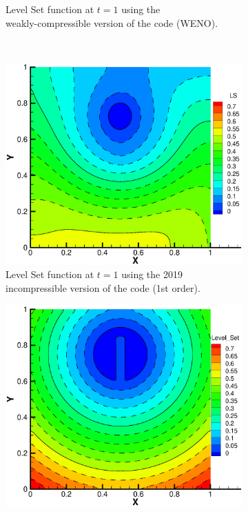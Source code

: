 \documentclass[11pt, a4paper, oneside, openany]{book}
\begin{document}
\begin{figure}[!ht]
\begin{subfigure}{.5\textwidth}
		\caption[Zalesak Weakly Compressible]{Level Set function at $t=1$ using the\\weakly-compressible version of the code (WENO).}\label{ZalesakWC_T1}
	\end{subfigure}\\
	\begin{subfigure}{.5\textwidth}
		\captionsetup{justification=centering}
		\includegraphics[trim={1.75cm 1.5cm 2.5cm 2.1cm},clip,width=1\textwidth]{ZalesakIC_O_T1.eps}
		\caption[Zalesak Incompressible Old]{Level Set function at $t=1$ using the 2019\\incompressible version of the code (1st order).}\label{ZalesakICO_T1}
	\end{subfigure}%
	\begin{subfigure}{.5\textwidth}
		\captionsetup{justification=centering}
		\includegraphics[trim={1.75cm 1.5cm 2.5cm 2.1cm},clip,width=1\textwidth]{ZalesakIC_N_T1.eps}

\end{subfigure}
\end{figure}
\end{document}
